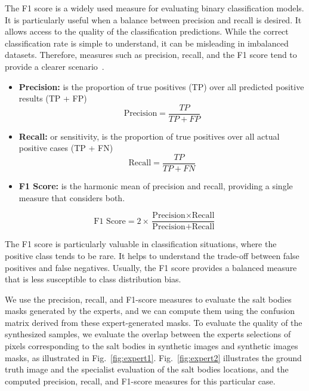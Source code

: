 \documentclass{ieeeaccess}
\begin{document}
The F1 score is a widely used measure for evaluating binary classification models. It is particularly useful when a balance between precision and recall is desired. It allows access to the quality of the classification predictions. While the correct classification rate is simple to understand, it can be misleading in imbalanced datasets. Therefore, measures such as precision, recall, and the F1 score tend to provide a clearer scenario~\cite{Powers2011}.

\begin{itemize}
    \item \textbf{Precision:} is the proportion of true positives (TP) over all predicted positive results (TP + FP)
    \begin{equation}
    \text{Precision} = \frac{TP}{TP + FP}
    \end{equation}

    \item \textbf{Recall:} or sensitivity, is the proportion of true positives over all actual positive cases (TP + FN)
    \begin{equation}
    \text{Recall} = \frac{TP}{TP + FN}
    \end{equation}

    \item \textbf{F1 Score:} is the harmonic mean of precision and recall, providing a single measure that considers both. 

\end{itemize}
    \begin{equation}
    \text{F1 Score} = 2 \times \frac{\text{Precision} \times \text{Recall}}{\text{Precision} + \text{Recall}}
    \end{equation}
    
The F1 score is particularly valuable in classification situations, where the positive class tends to be rare. It helps to understand the trade-off between false positives and false negatives. Usually, the F1 score provides a balanced measure that is less susceptible to class distribution bias.

We use the precision, recall, and F1-score measures to evaluate the salt bodies masks generated by the experts, and we can compute them using the confusion matrix derived from these expert-generated masks. To evaluate the quality of the synthesized samples, we evaluate the overlap between the experts selections of pixels corresponding to the salt bodies in synthetic images and synthetic images masks, as illustrated in Fig.~\ref{fig:expert1}. Fig.~\ref{fig:expert2} illustrates the ground truth image and the specialist evaluation of the salt bodies locations, and the computed precision, recall, and F1-score measures for this particular case.
\end{document}
